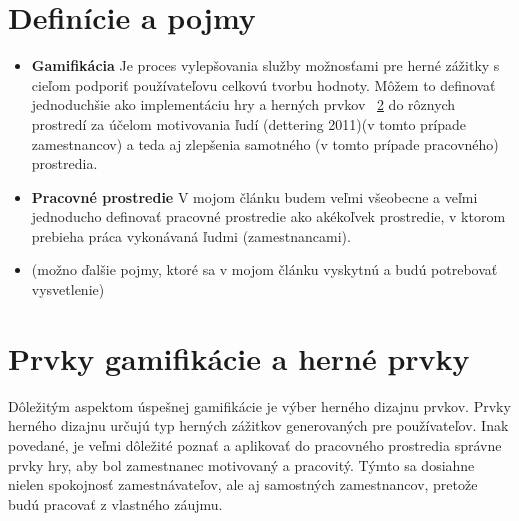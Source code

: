 \documentclass{article}
\begin{document}
\section{Definície a pojmy} \label{definície}
\begin{itemize}
\item \textbf{Gamifikácia} Je proces vylepšovania služby
možnosťami pre herné zážitky s cieľom podporiť používateľovu
celkovú tvorbu hodnoty\cite{10.1145/2393132.2393137}. Môžem to definovať jednoduchšie ako implementáciu hry a herných prvkov ~\ref{prvky} do rôznych prostredí za účelom motivovania ľudí (dettering 2011)(v tomto prípade zamestnancov) a teda aj zlepšenia samotného (v tomto prípade pracovného) prostredia.
\item \textbf{Pracovné prostredie} V mojom článku budem veľmi všeobecne a veľmi jednoducho definovať pracovné prostredie ako akékoľvek prostredie, v ktorom prebieha práca vykonávaná ľudmi (zamestnancami).
\item (možno ďalšie pojmy, ktoré sa v mojom článku vyskytnú a budú potrebovať vysvetlenie)
\end{itemize}
%



\section{Prvky gamifikácie a herné prvky} \label{prvky}


Dôležitým aspektom úspešnej gamifikácie je výber herného dizajnu
prvkov. Prvky herného dizajnu určujú typ herných zážitkov
generovaných pre používateľov\cite{herne}. Inak povedané, je veľmi dôležité poznať a aplikovať do pracovného prostredia správne prvky hry, aby bol zamestnanec motivovaný a pracovitý. Týmto sa dosiahne nielen spokojnosť zamestnávateľov, ale aj samostných zamestnancov, pretože budú pracovať z vlastného záujmu. 
\end{document}
